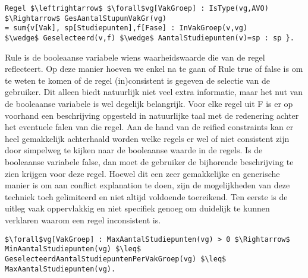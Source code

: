 \begin{lstlisting}[mathescape, caption=IDP Reified Constraint Example, frame=single]
Regel $\leftrightarrow$ $\forall$vg[VakGroep] : IsType(vg,AVO) $\Rightarrow$ GesAantalStupunVakGr(vg) 
= sum{v[Vak], sp[Studiepunten],f[Fase] : InVakGroep(v,vg) 
$\wedge$ Geselecteerd(v,f) $\wedge$ AantalStudiepunten(v)=sp : sp }.
\end{lstlisting}
Rule is de booleaanse variabele wiens waarheidswaarde die van de regel reflecteert. Op deze manier hoeven we enkel na te gaan of Rule true of false is om te weten te komen of de regel (in)consistent is gegeven de selectie van de gebruiker. Dit alleen biedt natuurlijk niet veel extra informatie, maar het nut van de booleaanse variabele is wel degelijk belangrijk. Voor elke regel uit F is er op voorhand een beschrijving opgesteld in natuurlijke taal met de redenering achter het eventuele falen van die regel. Aan de hand van de reified constraints kan er heel gemakkelijk achterhaald worden welke regels er wel of niet consistent zijn door simpelweg te kijken naar de booleaanse waarde in de regels. Is de booleaanse variabele false, dan moet de gebruiker de bijhorende beschrijving te zien krijgen voor deze regel. Hoewel dit een zeer gemakkelijke en generische manier is om aan conflict explanation te doen, zijn de mogelijkheden van deze techniek toch gelimiteerd en niet altijd voldoende toereikend. Ten eerste is de uitleg vaak oppervlakkig en niet specifiek genoeg om duidelijk te kunnen verklaren waarom een regel inconsistent is. 
\begin{lstlisting}[mathescape, caption=Reified constraint Shortcomings, frame=single]
$\forall$vg[VakGroep] : MaxAantalStudiepunten(vg) > 0 $\Rightarrow$ 
MinAantalStudiepunten(vg) $\leq$ GeselecteerdAantalStudiepuntenPerVakGroep(vg) $\leq$ MaxAantalStudiepunten(vg).
\end{lstlisting}
